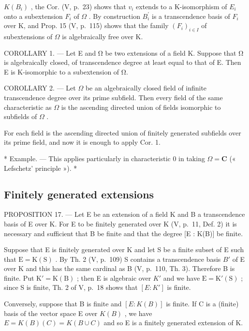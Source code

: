 \(K(B_{i})\) , the Cor. (V, p.~23) shows that \(v_{i}\) extends to a K-isomorphism of \(E_{i}\) onto a subextension \(F_{i}\) of \(\Omega\) . By construction \(B_{i}^{\prime}\) is a transcendence basis of \(F_{i}\) over K, and Prop. 15 (V, p.~115) shows that the family \((F_{i})_{i\in I}\) of subextensions of \(\Omega\) is algebraically free over K.

COROLLARY 1. --- Let E and Ω be two extensions of a field K. Suppose that Ω is algebraically closed, of transcendence degree at least equal to that of E. Then E is K-isomorphic to a subextension of Ω.

COROLLARY 2. --- Let \(\Omega\) be an algebraically closed field of infinite transcendence degree over its prime subfield. Then every field of the same characteristic as \(\Omega\) is the ascending directed union of fields isomorphic to subfields of \(\Omega\) .

For each field is the ascending directed union of finitely generated subfields over its prime field, and now it is enough to apply Cor. 1.

* Example. --- This applies particularly in characteristic 0 in taking \(\Omega = \mathbf{C}\) (« Lefschetz' principle »). *

\subsection{Finitely generated extensions}

PROPOSITION 17. --- Let E be an extension of a field K and B a transcendence basis of E over K. For E to be finitely generated over K (V, p.~11, Def. 2) it is necessary and sufficient that B be finite and that the degree {[}E : K(B){]} be finite.

Suppose that E is finitely generated over K and let S be a finite subset of E such that \(\mathrm{E} = \mathrm{K}(\mathrm{S})\) . By Th. 2 (V, p.~109) S contains a transcendence basis \(B'\) of E over K and this has the same cardinal as B (V, p.~110, Th. 3). Therefore B is finite. Put \(\mathrm{K}' = \mathrm{K}(\mathrm{B})\) ; then E is algebraic over \(K'\) and we have \(\mathrm{E} = \mathrm{K}'(\mathrm{S})\) ; since S is finite, Th. 2 of V, p.~18 shows that \([E : K']\) is finite.

Conversely, suppose that B is finite and \([E:K(B)]\) is finite. If C is a (finite) basis of the vector space E over \(K(B)\) , we have \(E = K(B)(C) = K(B \cup C)\) and so E is a finitely generated extension of K.

